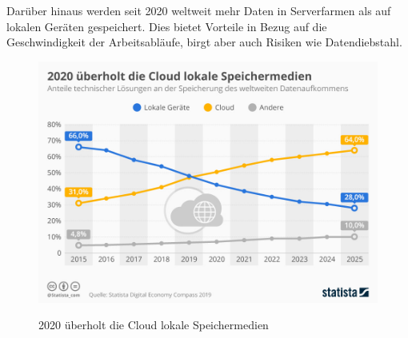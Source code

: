 Darüber hinaus werden seit 2020 weltweit mehr Daten in Serverfarmen als auf lokalen Geräten gespeichert. Dies bietet Vorteile in Bezug auf die Geschwindigkeit der Arbeitsabläufe, birgt aber auch Risiken wie Datendiebstahl. 
\begin{figure}[h!]
      \centering
      \includegraphics[scale=0.4]{sources/moreCloudStorageThanLocal}
      \caption[2020 überholt die Cloud lokale Speichermedien]{}\label{fig:moreCloudStorageThanLocal} 
      2020 überholt die Cloud lokale Speichermedien  
      {\cite{STA1}}
    \end{figure}

